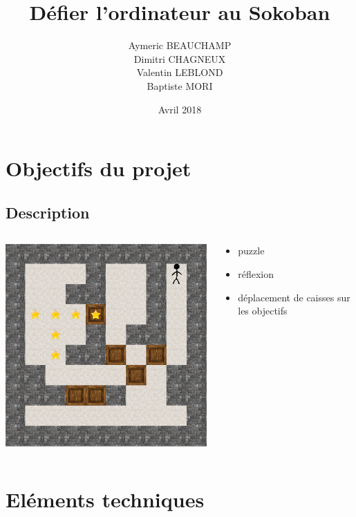 \documentclass{beamer}
\title{Défier l'ordinateur au Sokoban}
\author{Aymeric BEAUCHAMP\\Dimitri CHAGNEUX\\Valentin LEBLOND\\Baptiste MORI}
\date{Avril 2018}
\begin{document}
 
\maketitle 

\frame{\tableofcontents}

\section{Objectifs du projet}
\subsection{Description}
\begin{frame} %
\begin{columns}
\hspace{0.5cm}
\begin{column}{5cm}
\includegraphics[scale=0.3]{images/sokoban.png}
\end{column}
\begin{column}{6cm}
\begin{itemize}
\item puzzle
\item réflexion
\item déplacement de caisses sur les objectifs
\end{itemize}
\end{column}
\end{columns}
\end{frame}

\section{Eléments techniques}
\end{document}
